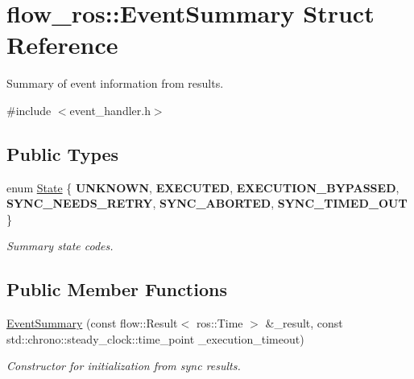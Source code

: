 \hypertarget{structflow__ros_1_1_event_summary}{}\section{flow\+\_\+ros\+:\+:Event\+Summary Struct Reference}
\label{structflow__ros_1_1_event_summary}


Summary of event information from results.  




{\ttfamily \#include $<$event\+\_\+handler.\+h$>$}

\subsection*{Public Types}
\begin{DoxyCompactItemize}
\item 
\mbox{\label{structflow__ros_1_1_event_summary_a9b5a677b4629e3c40e36a49a3f2cea6b}} 
enum \hyperlink{structflow__ros_1_1_event_summary_a9b5a677b4629e3c40e36a49a3f2cea6b}{State} \{ \newline
{\bfseries U\+N\+K\+N\+O\+WN}, 
{\bfseries E\+X\+E\+C\+U\+T\+ED}, 
{\bfseries E\+X\+E\+C\+U\+T\+I\+O\+N\+\_\+\+B\+Y\+P\+A\+S\+S\+ED}, 
{\bfseries S\+Y\+N\+C\+\_\+\+N\+E\+E\+D\+S\+\_\+\+R\+E\+T\+RY}, 
\newline
{\bfseries S\+Y\+N\+C\+\_\+\+A\+B\+O\+R\+T\+ED}, 
{\bfseries S\+Y\+N\+C\+\_\+\+T\+I\+M\+E\+D\+\_\+\+O\+UT}
 \}\begin{DoxyCompactList}\small\item\em Summary state codes. \end{DoxyCompactList}
\end{DoxyCompactItemize}
\subsection*{Public Member Functions}
\begin{DoxyCompactItemize}
\item 
\hyperlink{structflow__ros_1_1_event_summary_af5403b915dc7bb690c216e445c12d655}{Event\+Summary} (const flow\+::\+Result$<$ ros\+::\+Time $>$ \&\+\_\+result, const std\+::chrono\+::steady\+\_\+clock\+::time\+\_\+point \+\_\+execution\+\_\+timeout)
\begin{DoxyCompactList}\small\item\em Constructor for initialization from sync results. \end{DoxyCompactList}\end{DoxyCompactItemize}
